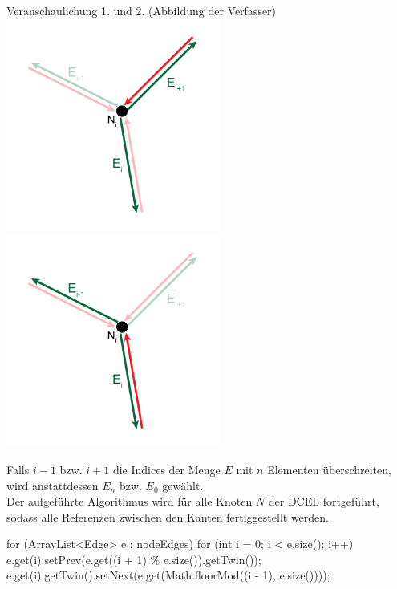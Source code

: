 \begin{Bild}{Veranschaulichung 1. und 2. (Abbildung der Verfasser)}
	\includegraphics[width = 70mm]{Bilder/Beziehung1Kanten}
	\includegraphics[width = 70mm]{Bilder/Beziehung2Kanten}
\end{Bild}

Falls $i-1$ bzw. $i+1$ die Indices der Menge $E$ mit $n$ Elementen überschreiten, wird anstattdessen $E_n$ bzw. $E_0$ gewählt. \\
Der aufgeführte Algorithmus wird für alle Knoten $N$ der DCEL fortgeführt, sodass alle Referenzen zwischen den Kanten fertiggestellt werden.  \\

\begin{code}
	for (ArrayList<Edge> e : nodeEdges) {
		for (int i = 0; i < e.size(); i++) {
			e.get(i).setPrev(e.get((i + 1) \% e.size()).getTwin());
			e.get(i).getTwin().setNext(e.get(Math.floorMod((i - 1), e.size())));
		}
	}
\end{code}

